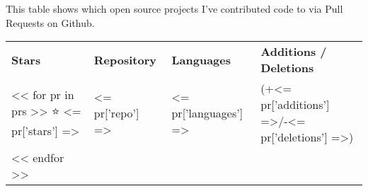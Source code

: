 \documentclass[../cv.tex]{subfiles}
\begin{document}
This table shows which open source projects I've contributed code to via Pull Requests on Github.

\begin{tabular}{llll}
\textbf{Stars} & \textbf{Repository} & \textbf{Languages} & \textbf{Additions / Deletions} \\
<< for pr in prs >>
⭐ <= pr['stars'] => & <= pr['repo'] => & <= pr['languages'] => & (+<= pr['additions'] =>/-<= pr['deletions'] =>)\\
<< endfor >>
\end{tabular}
\end{document}
